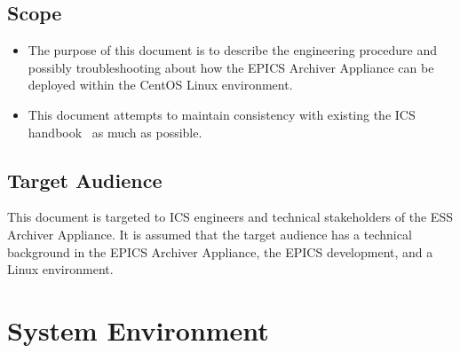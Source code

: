 \documentclass[11pt
  , a4paper
  , article
  , oneside
  , showtrims
]{memoir}
\begin{document}
\section{Scope}
\begin{itemize}
\item The purpose of this document is to describe the engineering procedure and possibly troubleshooting about how the EPICS Archiver Appliance can be deployed within the CentOS Linux environment. 
\item This document attempts to maintain consistency with existing the ICS handbook~\cite{ESS006763} as much as possible.
\end{itemize}

\section{Target Audience}
This document is targeted to ICS engineers and technical stakeholders of the ESS Archiver Appliance. It is assumed that the target audience has a technical background in the EPICS Archiver Appliance, the EPICS development, and a Linux environment.

\chapter{System Environment}
\end{document}
